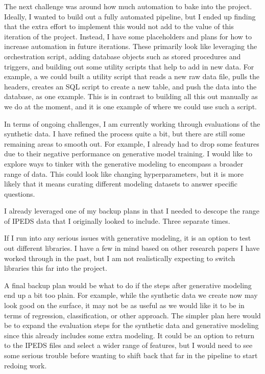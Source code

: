 \documentclass[sigconf, authorversion, nonacm]{acmart}
\begin{document}
    The next challenge was around how much automation to bake into the project. Ideally, I wanted to build out a fully automated pipeline, but I ended up finding that the extra effort to implement this would not add to the value of this iteration of the project. Instead, I have some placeholders and plans for how to increase automation in future iterations. These primarily look like leveraging the orchestration script, adding database objects such as stored procedures and triggers, and building out some utility scripts that help to add in new data. For example, a we could built a utility script that reads a new raw data file, pulls the headers, creates an SQL script to create a new table, and push the data into the database, as one example. This is in contrast to building all this out manually as we do at the moment, and it is one example of where we could use such a script.

    In terms of ongoing challenges, I am currently working through evaluations of the synthetic data. I have refined the process quite a bit, but there are still some remaining areas to smooth out. For example, I already had to drop some features due to their negative performance on generative model training. I would like to explore ways to tinker with the generative modeling to encompass a broader range of data. This could look like changing hyperparameters, but it is more likely that it means curating different modeling datasets to answer specific questions.

    I already leveraged one of my backup plans in that I needed to descope the range of IPEDS data that I originally looked to include. Three separate times.

    If I run into any serious issues with generative modeling, it is an option to test out different libraries. I have a few in mind based on other research papers I have worked through in the past, but I am not realistically expecting to switch libraries this far into the project.

    A final backup plan would be what to do if the steps after generative modeling end up a bit too plain. For example, while the synthetic data we create now may look good on the surface, it may not be as useful as we would like it to be in terms of regression, classification, or other approach. The simpler plan here would be to expand the evaluation steps for the synthetic data and generative modeling since this already includes some extra modeling. It could be an option to return to the IPEDS files and select a wider range of features, but I would need to see some serious trouble before wanting to shift back that far in the pipeline to start redoing work.
\end{document}

